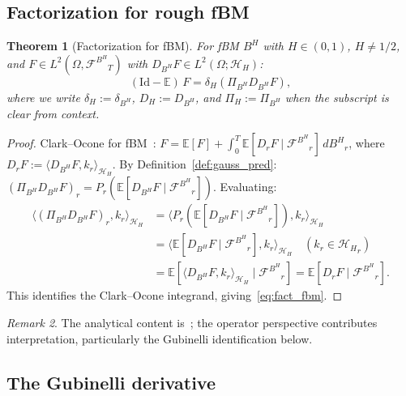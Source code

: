 \documentclass[11pt,a4paper]{article}
\theoremstyle{plain}
\newtheorem{theorem}{Theorem}[section]
\theoremstyle{definition}
\theoremstyle{remark}
\newtheorem{remark}[theorem]{Remark}
\newcommand{\E}{\mathbb{E}}
\newcommand{\Id}{\mathrm{Id}}
\newcommand{\HH}{\mathcal{H}_H}
\newcommand{\BH}{B^H}
\newcommand{\FBH}{\mathcal{F}^{B^H}}
\begin{document}
\subsection{Factorization for rough fBM}

\begin{theorem}[Factorization for fBM]\label{thm:fact_fbm}
For fBM $\BH$ with $H \in (0,1)$, $H \neq 1/2$, and $F \in L^2(\Omega,{\FBH}_T)$ with $D_{\BH}F \in L^2(\Omega;\HH)$:
\begin{equation}\label{eq:fact_fbm}
(\Id-\E)\,F = \delta_H(\Pi_{\BH}D_{\BH}F),
\end{equation}
where we write $\delta_H := \delta_{\BH}$, $D_H := D_{\BH}$, and $\Pi_H := \Pi_{\BH}$ when the subscript is clear from context.
\end{theorem}

\begin{proof}
Clark--Ocone for fBM~\cite[Theorem 3.1]{Decreusefond1999}: $F = \E[F]+\int_0^T\E[D_rF\mid{\FBH}_r]\,d{\BH}_r$, where $D_rF := \langle D_{\BH}F, k_r\rangle_{\HH}$. By Definition~\ref{def:gauss_pred}: $(\Pi_{\BH}D_{\BH}F)_r = P_r(\E[D_{\BH}F\mid{\FBH}_r])$. Evaluating:
\begin{align*}
\langle(\Pi_{\BH}D_{\BH}F)_r, k_r\rangle_{\HH} &= \langle P_r(\E[D_{\BH}F\mid{\FBH}_r]), k_r\rangle_{\HH} \\
&= \langle\E[D_{\BH}F\mid{\FBH}_r], k_r\rangle_{\HH} \quad(k_r \in {\HH}_r) \\
&= \E[\langle D_{\BH}F, k_r\rangle_{\HH}\mid{\FBH}_r] = \E[D_rF\mid{\FBH}_r].
\end{align*}
This identifies the Clark--Ocone integrand, giving~\eqref{eq:fact_fbm}.
\end{proof}

\begin{remark}\label{rem:honest_gauss}
The analytical content is~\cite{Decreusefond1999}; the operator perspective contributes interpretation, particularly the Gubinelli identification below.
\end{remark}

\subsection{The Gubinelli derivative}
\end{document}
